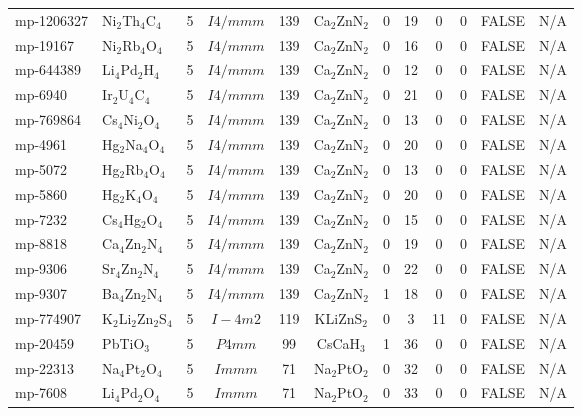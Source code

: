 {\begin{longtable}{llcccccccccc}
    mp-1206327 & Ni$_{2}$Th$_{4}$C$_{4}$ & 5     & $I4/mmm$ & 139   & Ca$_{2}$ZnN$_{2}$ & 0     & 19    & 0     & 0     & FALSE & N/A \\
    mp-19167 & Ni$_{2}$Rb$_{4}$O$_{4}$ & 5     & $I4/mmm$ & 139   & Ca$_{2}$ZnN$_{2}$ & 0     & 16    & 0     & 0     & FALSE & N/A \\
    mp-644389 & Li$_{4}$Pd$_{2}$H$_{4}$ & 5     & $I4/mmm$ & 139   & Ca$_{2}$ZnN$_{2}$ & 0     & 12    & 0     & 0     & FALSE & N/A \\
    mp-6940 & Ir$_{2}$U$_{4}$C$_{4}$ & 5     & $I4/mmm$ & 139   & Ca$_{2}$ZnN$_{2}$ & 0     & 21    & 0     & 0     & FALSE & N/A \\
    mp-769864 & Cs$_{4}$Ni$_{2}$O$_{4}$ & 5     & $I4/mmm$ & 139   & Ca$_{2}$ZnN$_{2}$ & 0     & 13    & 0     & 0     & FALSE & N/A \\
    mp-4961 & Hg$_{2}$Na$_{4}$O$_{4}$ & 5     & $I4/mmm$ & 139   & Ca$_{2}$ZnN$_{2}$ & 0     & 20    & 0     & 0     & FALSE & N/A \\
    mp-5072 & Hg$_{2}$Rb$_{4}$O$_{4}$ & 5     & $I4/mmm$ & 139   & Ca$_{2}$ZnN$_{2}$ & 0     & 13    & 0     & 0     & FALSE & N/A \\
    mp-5860 & Hg$_{2}$K$_{4}$O$_{4}$ & 5     & $I4/mmm$ & 139   & Ca$_{2}$ZnN$_{2}$ & 0     & 20    & 0     & 0     & FALSE & N/A \\
    mp-7232 & Cs$_{4}$Hg$_{2}$O$_{4}$ & 5     & $I4/mmm$ & 139   & Ca$_{2}$ZnN$_{2}$ & 0     & 15    & 0     & 0     & FALSE & N/A \\
    mp-8818 & Ca$_{4}$Zn$_{2}$N$_{4}$ & 5     & $I4/mmm$ & 139   & Ca$_{2}$ZnN$_{2}$ & 0     & 19    & 0     & 0     & FALSE & N/A \\
    mp-9306 & Sr$_{4}$Zn$_{2}$N$_{4}$ & 5     & $I4/mmm$ & 139   & Ca$_{2}$ZnN$_{2}$ & 0     & 22    & 0     & 0     & FALSE & N/A \\
    mp-9307 & Ba$_{4}$Zn$_{2}$N$_{4}$ & 5     & $I4/mmm$ & 139   & Ca$_{2}$ZnN$_{2}$ & 1     & 18    & 0     & 0     & FALSE & N/A \\
    mp-774907 & K$_{2}$Li$_{2}$Zn$_{2}$S$_{4}$ & 5     & $I-4m2$ & 119   & KLiZnS$_{2}$ & 0     & 3     & 11    & 0     & FALSE & N/A \\
    mp-20459 & PbTiO$_{3}$ & 5     & $P4mm$ & 99    & CsCaH$_{3}$ & 1     & 36    & 0     & 0     & FALSE & N/A \\
    mp-22313 & Na$_{4}$Pt$_{2}$O$_{4}$ & 5     & $Immm$ & 71    & Na$_{2}$PtO$_{2}$ & 0     & 32    & 0     & 0     & FALSE & N/A \\
    mp-7608 & Li$_{4}$Pd$_{2}$O$_{4}$ & 5     & $Immm$ & 71    & Na$_{2}$PtO$_{2}$ & 0     & 33    & 0     & 0     & FALSE & N/A \\

\end{longtable}}
